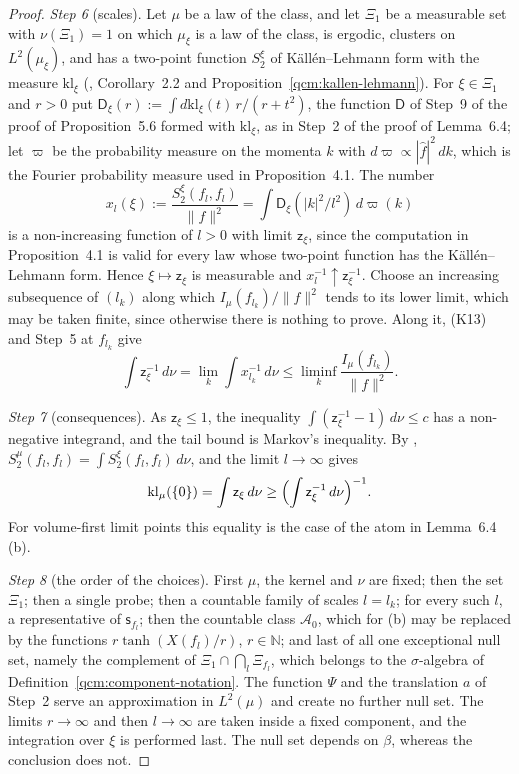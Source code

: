 \documentclass[11pt,letterpaper,reqno]{amsart}
\theoremstyle{definition}
\begin{document}
\begin{proof}
\emph{Step 6} (scales).
Let $\mu$ be a law of the class, and let $\Xi_1$ be a measurable set with $\nu(\Xi_1)=1$ on which $\mu_\xi$ is a law of the class, is ergodic, clusters on $L^2(\mu_\xi)$, and has a two-point function $S_2^\xi$ of K\"all\'en--Lehmann form with the measure $\mathrm{kl}_\xi$ (\cite[Theorem~A]{ErgodicComponents}, Corollary~2.2 and Proposition~\ref{qcm:kallen-lehmann}).
For $\xi\in\Xi_1$ and $r>0$ put $\mathsf D_\xi(r):=\int d\mathrm{kl}_\xi(t)\,r/(r+t^2)$, the function $\mathsf D$ of Step~9 of the proof of Proposition~5.6 formed with $\mathrm{kl}_\xi$, as in Step~2 of the proof of Lemma~6.4;
let $\varpi$ be the probability measure on the momenta $k$ with $d\varpi\propto|\hat f|^2\,dk$, which is the Fourier probability measure used in Proposition~4.1.
The number
\begin{equation*}
x_l(\xi):=\frac{S_2^\xi(f_l,f_l)}{\|f\|^2}=\int\mathsf D_\xi(|k|^2/l^2)\,d\varpi(k)
\end{equation*}
is a non-increasing function of $l>0$ with limit $\mathsf z_\xi$, since the computation in Proposition~4.1 is valid for every law whose two-point function has the K\"all\'en--Lehmann form.
Hence $\xi\mapsto\mathsf z_\xi$ is measurable and $x_l^{-1}\uparrow\mathsf z_\xi^{-1}$.
Choose an increasing subsequence of $(l_k)$ along which $I_\mu(f_{l_k})/\|f\|^2$ tends to its lower limit, which may be taken finite, since otherwise there is nothing to prove.
Along it, (K13) and Step~5 at $f_{l_k}$ give
\begin{equation*}
\int\mathsf z_\xi^{-1}\,d\nu=\lim_k\int x_{l_k}^{-1}\,d\nu\le\liminf_k\frac{I_\mu(f_{l_k})}{\|f\|^2}.
\end{equation*}

\emph{Step 7} (consequences).
As $\mathsf z_\xi\le1$, the inequality $\int(\mathsf z_\xi^{-1}-1)\,d\nu\le c$ has a non-negative integrand, and the tail bound is Markov's inequality.
By \cite[Theorem~A and Section~5]{ErgodicComponents}, $S_2^\mu(f_l,f_l)=\int S_2^\xi(f_l,f_l)\,d\nu$, and the limit $l\to\infty$ gives
\begin{equation*}
\mathrm{kl}_\mu(\{0\})=\int\mathsf z_\xi\,d\nu\ge\Bigl(\int\mathsf z_\xi^{-1}\,d\nu\Bigr)^{-1}.
\end{equation*}
For volume-first limit points this equality is the case of the atom in Lemma~6.4\,(b).

\emph{Step 8} (the order of the choices).
First $\mu$, the kernel and $\nu$ are fixed;
then the set $\Xi_1$;
then a single probe;
then a countable family of scales $l=l_k$;
for every such $l$, a representative of $\mathsf s_{f_l}$;
then the countable class $\mathcal A_0$, which for (b) may be replaced by the functions $r\tanh(X(f_l)/r)$, $r\in\mathbb N$;
and last of all one exceptional null set, namely the complement of $\Xi_1\cap\bigcap_l\Xi_{f_l}$, which belongs to the $\sigma$-algebra of Definition~\ref{qcm:component-notation}.
The function $\Psi$ and the translation $a$ of Step~2 serve an approximation in $L^2(\mu)$ and create no further null set.
The limits $r\to\infty$ and then $l\to\infty$ are taken inside a fixed component, and the integration over $\xi$ is performed last.
The null set depends on $\beta$, whereas the conclusion does not.
\end{proof}
\end{document}
